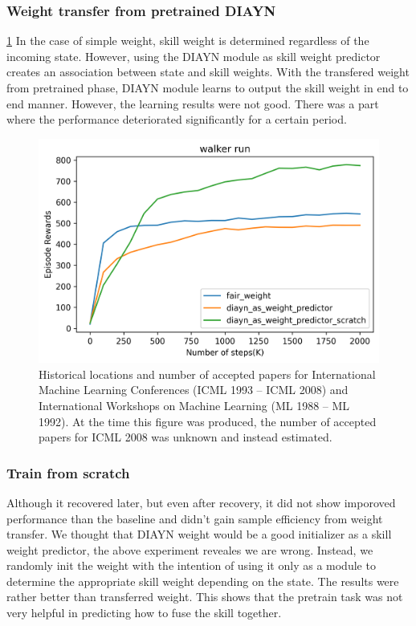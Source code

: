\subsubsection{Weight transfer from pretrained DIAYN}

\cref*{diayn-as-skill-weight}
In the case of simple weight, skill weight is determined regardless of the incoming state.
However, using the DIAYN module as skill weight predictor creates an association between state and skill weights.
With the transfered weight from pretrained phase, DIAYN module learns to output the skill weight in end to end manner.
However, the learning results were not good.
There was a part where the performance deteriorated significantly for a certain period.

\begin{figure}[ht]
  \vskip 0.2in
  \begin{center}
  \centerline{\includegraphics[width=\columnwidth]{Figures/fair_weight_and_diayn_as_weight_predictor.png}}
  \caption{Historical locations and number of accepted papers for International
  Machine Learning Conferences (ICML 1993 -- ICML 2008) and International
  Workshops on Machine Learning (ML 1988 -- ML 1992). At the time this figure was
  produced, the number of accepted papers for ICML 2008 was unknown and instead
  estimated.}
  \label{diayn-as-skill-weight}
  \end{center}
  \vskip -0.2in
  \end{figure}

\subsubsection{Train from scratch}
Although it recovered later, but even after recovery, it did not show imporoved performance than the baseline and didn't gain sample efficiency from weight transfer.
We thought that DIAYN weight would be a good initializer as a skill weight predictor, the above experiment reveales we are wrong.
Instead, we randomly init the weight with the intention of using it only as a module to determine the appropriate skill weight depending on the state.
The results were rather better than transferred weight.
This shows that the pretrain task was not very helpful in predicting how to fuse the skill together.




